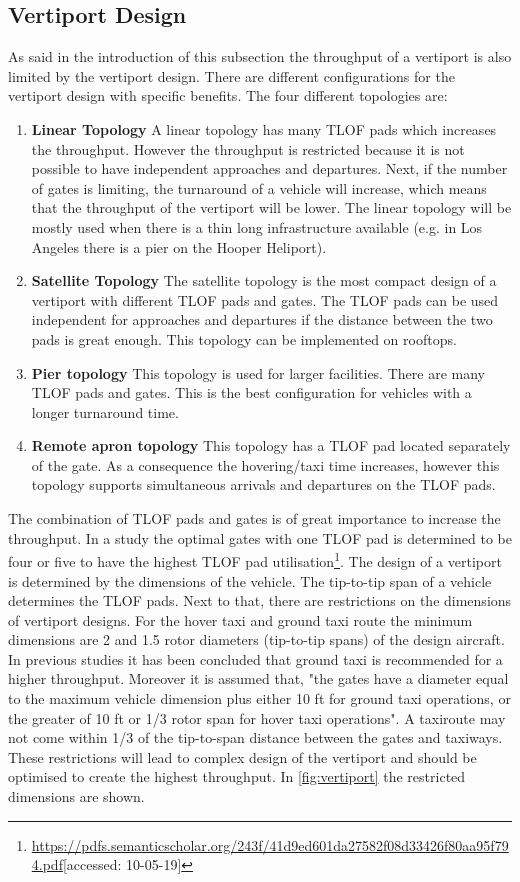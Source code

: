 \subsection{Vertiport Design} \label{subsec:vportDesign}
As said in the introduction of this subsection the throughput of a vertiport is also limited by the vertiport design. There are different configurations for the vertiport design with specific benefits. The four different topologies are:
\begin{enumerate}[nolistsep]
    \item \textbf{Linear Topology} A linear topology has many TLOF pads which increases the throughput. However the throughput is restricted because it is not possible to have independent approaches and departures. Next, if the number of gates is limiting, the turnaround of a vehicle will increase, which means that the throughput of the vertiport will be lower. The linear topology will be mostly used when there is a thin long infrastructure available (e.g. in Los Angeles there is a pier on the Hooper Heliport).
    \item \textbf{Satellite Topology} The satellite topology is the most compact design of a vertiport with different TLOF pads and gates. The TLOF pads can be used independent for approaches and departures if the distance between the two pads is great enough. This topology can be implemented on rooftops.
    \item  \textbf{Pier topology} This topology is used for larger facilities. There are many TLOF pads and gates. This is the best configuration for vehicles with a longer turnaround time.
    \item \textbf{Remote apron topology} This topology has a TLOF pad located separately of the gate. As a consequence the hovering/taxi time increases, however this topology supports simultaneous arrivals and departures on the TLOF pads.
\end{enumerate}
The combination of TLOF pads and gates is of great importance to increase the throughput. In a study the optimal gates with one TLOF pad is determined to be four or five to have the highest TLOF pad utilisation\footnote{\url{https://pdfs.semanticscholar.org/243f/41d9ed601da27582f08d33426f80aa95f794.pdf}[accessed: 10-05-19]}. The design of a vertiport is determined by the dimensions of the vehicle. The tip-to-tip span of a vehicle determines the TLOF pads. Next to that, there are restrictions on the dimensions of vertiport designs. For the hover taxi and ground taxi route the minimum dimensions are 2 and 1.5 rotor diameters (tip-to-tip spans) of the design aircraft. In previous studies it has been concluded that ground taxi is recommended for a higher throughput. Moreover it is assumed that, "the gates have a diameter equal to the maximum vehicle dimension plus either 10 ft for ground taxi operations, or the greater of 10 ft or 1/3 rotor span for hover taxi operations"\footnotemark[\value{footnote}]. A taxiroute may not come within 1/3 of the tip-to-span distance between the gates and taxiways. These restrictions will lead to complex design of the vertiport and should be optimised to create the highest throughput. In \autoref{fig:vertiport} the restricted dimensions are shown.

